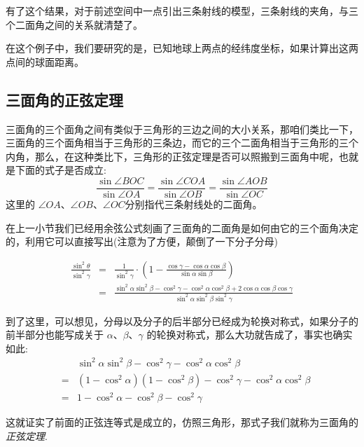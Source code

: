 有了这个结果，对于前述空间中一点引出三条射线的模型，三条射线的夹角，与三个二面角之间的关系就清楚了。

\begin{example}[根据经纬度计算地球上两点间的(球面)距离]
  在这个例子中，我们要研究的是，已知地球上两点的经纬度坐标，如果计算出这两点间的球面距离。
\end{example}

\subsection{三面角的正弦定理}
\label{sec:sine-thoream-of-trihedral-angle}

三面角的三个面角之间有类似于三角形的三边之间的大小关系，那咱们类比一下，三面角的三个面角相当于三角形的三条边，而它的三个二面角相当于三角形的三个内角，那么，在这种类比下，三角形的正弦定理是否可以照搬到三面角中呢，也就是下面的式子是否成立:
\[ \frac{\sin{\angle BOC}}{\sin{\angle OA}} = \frac{\sin{\angle COA}}{\sin{\angle OB}} = \frac{\sin{\angle AOB}}{\sin{\angle OC}} \]
这里的 $\angle OA$、$\angle OB$、$\angle OC$分别指代三条射线处的二面角。

在上一小节我们已经用余弦公式刻画了三面角的二面角是如何由它的三个面角决定的，利用它可以直接写出(注意为了方便，颠倒了一下分子分母)

\begin{eqnarray*}
  \frac{\sin^{2}{\theta}}{\sin^2{\gamma}} & = & \frac{1}{\sin^2{\gamma}} \cdot \left( 1-\frac{\cos{\gamma}-\cos{\alpha}\cos{\beta}}{\sin{\alpha}\sin{\beta}} \right) \\
  & = & \frac{\sin^2{\alpha}\sin^2{\beta}-\cos^2{\gamma}-\cos^2{\alpha}\cos^2{\beta}+2\cos{\alpha}\cos{\beta}\cos{\gamma}}{\sin^2{\alpha}\sin^2{\beta}\sin^2{\gamma}} 
\end{eqnarray*}

到了这里，可以想见，分母以及分子的后半部分已经成为轮换对称式，如果分子的前半部分也能写成关于 $\alpha$、$\beta$、$\gamma$ 的轮换对称式，那么大功就告成了，事实也确实如此:
\begin{eqnarray*}
  && \sin^2{\alpha}\sin^2{\beta}-\cos^2{\gamma}-\cos^2{\alpha}\cos^2{\beta} \\
  & = & (1-\cos^2{\alpha})(1-\cos^2{\beta})-\cos^2{\gamma}-\cos^2{\alpha}\cos^2{\beta} \\
   & = & 1-\cos^2{\alpha}-\cos^2{\beta}-\cos^2{\gamma}
\end{eqnarray*}

这就证实了前面的正弦连等式是成立的，仿照三角形，那式子我们就称为三面角的 \emph{正弦定理}.


